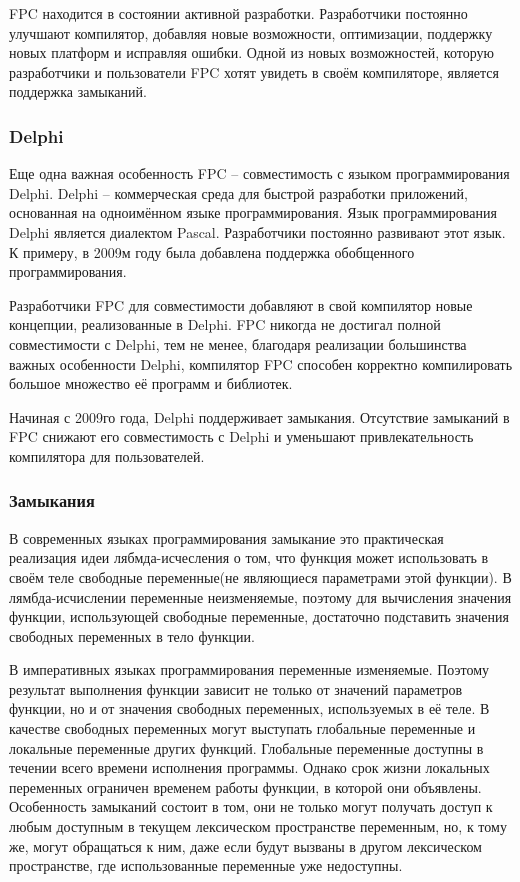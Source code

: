 \documentclass{imcs}
\begin{document}
FPC находится в состоянии активной разработки. Разработчики постоянно улучшают компилятор,
добавляя новые возможности, оптимизации, поддержку новых платформ и
исправляя ошибки\cite{fpc}.
Одной из новых возможностей, которую разработчики и пользователи FPC хотят увидеть в
своём компиляторе, является поддержка замыканий.

\subsubsection{Delphi}

Еще одна важная особенность FPC -- совместимость с языком программирования Delphi.
Delphi -- коммерческая среда для быстрой разработки приложений, основанная на одноимённом
языке программирования. Язык программирования Delphi является диалектом Pascal. 
Разработчики постоянно развивают этот язык. К примеру, в 2009м году была добавлена 
поддержка обобщенного программирования.

Разработчики FPC для совместимости добавляют в свой компилятор новые концепции, реализованные
в Delphi. FPC никогда не достигал полной совместимости с Delphi, тем не менее, благодаря
реализации большинства важных особенности Delphi, компилятор FPC способен корректно компилировать
большое множество её программ и библиотек.

Начиная с 2009го года, Delphi поддерживает замыкания\cite{delphichange}. Отсутствие замыканий в FPC
снижают его совместимость с Delphi и уменьшают привлекательность компилятора для пользователей.

\subsubsection{Замыкания}
В современных языках программирования замыкание это практическая реализация
идеи лябмда-исчесления о том, что функция может использовать в своём теле свободные
переменные(не являющиеся параметрами этой функции). В лямбда-исчислении
переменные неизменяемые, поэтому для вычисления значения функции, использующей
свободные переменные, достаточно подставить значения свободных переменных в тело
функции\cite{lambdatutor}.

В императивных языках программирования переменные изменяемые.
Поэтому результат выполнения функции зависит не только от значений параметров
функции, но и от значения свободных переменных, используемых в её теле. В качестве
свободных переменных могут выступать глобальные переменные и локальные переменные
других функций. Глобальные переменные доступны в течении всего времени исполнения программы.
Однако срок жизни
локальных переменных ограничен временем работы функции, в которой они объявлены.
Особенность замыканий состоит в том, они не только могут получать доступ к любым
доступным в текущем лексическом пространстве переменным, но, к тому же, могут
обращаться к ним, даже если будут вызваны в другом лексическом пространстве, где
использованные переменные уже недоступны.
\end{document}
